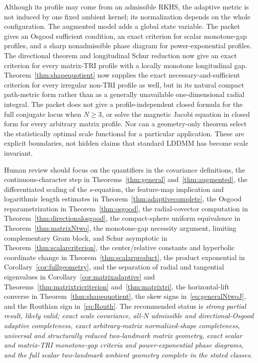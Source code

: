 \documentclass[11pt]{article}
\begin{document}
Although its profile may come from an admissible RKHS, the adaptive metric is
not induced by one fixed ambient kernel; its normalization depends on the
whole configuration.  The augmented model adds a global state variable.  The
packet gives an Osgood sufficient condition, an exact criterion for scalar
monotone-gap profiles, and a sharp nonadmissible phase diagram for
power-exponential profiles.  The directional theorem and longitudinal
Schur reduction now give an exact criterion for every matrix-TRI profile
with a locally monotone longitudinal gap.  Theorem~\ref{thm:shapequotient}
now supplies the exact necessary-and-sufficient criterion for every
irregular non-TRI profile as well, but in its natural compact path-metric
form rather than as a generally unavailable one-dimensional radial
integral.  The packet does not give a profile-independent closed formula for
the full conjugate locus when \(N\ge3\), or solve the magnetic Jacobi
equation in closed form for every arbitrary matrix profile.  Nor can a
geometry-only theorem select the statistically optimal scale functional for
a particular application.  These are explicit boundaries, not hidden claims
that standard LDDMM has become scale invariant.

Human review should focus on the quantifiers in the covariance definitions,
the continuous-character step in Theorems~\ref{thm:general}
and~\ref{thm:augmented}, the differentiated scaling of the \(s\)-equation,
the feature-map implication and logarithmic length estimates in
Theorem~\ref{thm:adaptivecomplete}, the Osgood reparametrization in
Theorem~\ref{thm:osgood}, the radial-covector computation in
Theorem~\ref{thm:directionalosgood}, the compact-sphere uniform equivalence
in Theorem~\ref{thm:matrixNtwo}, the monotone-gap necessity argument,
limiting complementary Gram block, and Schur asymptotic in
Theorem~\ref{thm:scalarcriterion}, the center/relative constants and
hyperbolic coordinate change in Theorem~\ref{thm:scalarproduct}, the product
exponential in Corollary~\ref{cor:fullgeometry}, and the separation of radial
and tangential eigenvalues in Corollary~\ref{cor:matrixadaptive} and
Theorems~\ref{thm:matrixtricriterion} and~\ref{thm:matrixtri}, the
horizontal-lift converse in Theorem~\ref{thm:shapequotient}, the skew signs
in~\eqref{eq:generalNtwoJ}, and the Routhian sign in~\eqref{eq:Routh}.  The
recommended status is \emph{strong partial result, likely valid; exact scale
covariance, all-\(N\) admissible and directional-Osgood adaptive
completeness, exact arbitrary-matrix normalized-shape completeness,
universal and structurally reduced two-landmark matrix geometry, exact scalar
and matrix-TRI monotone-gap criteria and power-exponential phase diagrams,
and the full scalar two-landmark ambient geometry complete in the stated
classes}.
\end{document}
